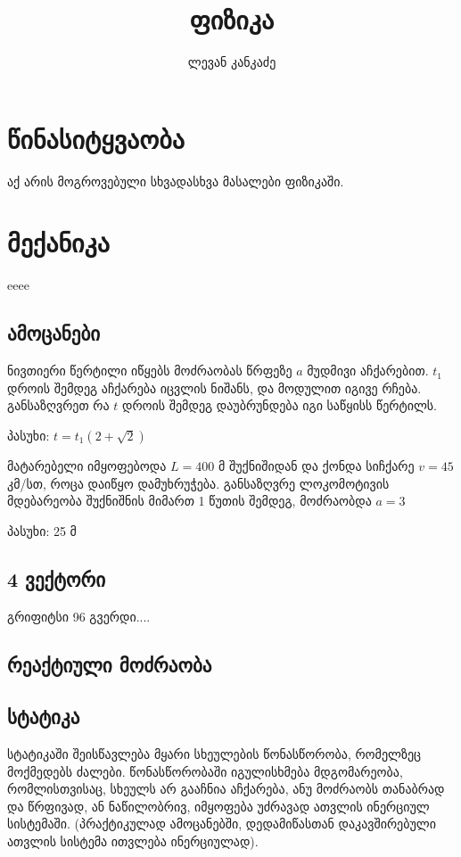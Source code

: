 \documentclass{book}
\title{ფიზიკა}
\author{ლევან კანკაძე}
\begin{document}
\maketitle

\tableofcontents

\chapter{წინასიტყვაობა}
აქ არის მოგროვებული სხვადასხვა მასალები ფიზიკაში.


\chapter{მექანიკა}
eeee
\section{ამოცანები}
ნივთიერი წერტილი იწყებს მოძრაობას წრფეზე $a$ მუდმივი აჩქარებით. $t_1$ დროის შემდეგ აჩქარება იცვლის ნიშანს, და მოდულით იგივე რჩება.
განსაზღვრეთ რა $t$ დროის შემდეგ დაუბრუნდება იგი საწყისს წერტილს.

პასუხი: $t = t_1(2 + \sqrt{2})$

მატარებელი იმყოფებოდა $L = 400$ მ შუქნიშიდან და ქონდა სიჩქარე $v = 45$ კმ/სთ, როცა დაიწყო დამუხრუჭება. 
განსაზღვრე ლოკომოტივის მდებარეობა შუქნიშნის მიმართ 1 წუთის შემდეგ, მოძრაობდა $a = 3$

პასუხი: 25 მ

\section{4 ვექტორი}
გრიფიტსი 96 გვერდი....
\section{რეაქტიული მოძრაობა}

\section{სტატიკა} სტატიკაში შეისწავლება მყარი სხეულების წონასწორობა, რომელზეც მოქმედებს ძალები. წონასწორობაში იგულისხმება მდგომარეობა, რომლისთვისაც, სხეულს არ გააჩნია აჩქარება, ანუ მოძრაობს თანაბრად და წრფივად, ან ნაწილობრივ, იმყოფება უძრავად ათვლის ინერციულ სისტემაში. (პრაქტიკულად ამოცანებში, დედამიწასთან დაკავშირებული ათვლის სისტემა ითვლება ინერციულად).
\end{document}
